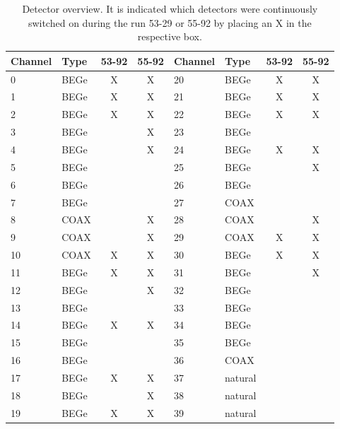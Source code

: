 \begin{table}
    \centering
	\begin{tabular}{|l|l|c|c||l|l|c|c|}
		\hline
		Channel & Type & 53-92 & 55-92 & Channel & Type & 53-92 & 55-92 \\
		\hline
		0 & BEGe & X & X & 20 & BEGe & X & X \\
		\hline
		1 & BEGe & X & X & 21 & BEGe & X & X \\
		\hline
		2 & BEGe & X & X & 22 & BEGe & X & X \\
		\hline
		3 & BEGe &  & X & 23 & BEGe &  &  \\
		\hline
		4 & BEGe &  & X & 24 & BEGe & X & X \\
		\hline
		5 & BEGe &  &  & 25 & BEGe &  & X \\
		\hline
		6 & BEGe &  &  & 26 & BEGe &  &  \\
		\hline
		7 & BEGe &  &  & 27 & COAX &  &  \\
		\hline
		8 & COAX &  & X & 28 & COAX &  & X \\
		\hline
		9 & COAX &  & X & 29 & COAX & X & X \\
		\hline
		10 & COAX & X & X & 30 & BEGe & X & X \\
		\hline
		11 & BEGe & X & X & 31 & BEGe &  & X \\
		\hline
		12 & BEGe &  & X & 32 & BEGe &  &  \\
		\hline
		13 & BEGe &  &  & 33 & BEGe &  &  \\
		\hline
		14 & BEGe & X & X & 34 & BEGe & &  \\
		\hline
		15 & BEGe &  &  & 35 & BEGe &  &  \\
		\hline
		16 & BEGe &  &  & 36 & COAX &  &  \\
		\hline
		17 & BEGe & X & X & 37 & natural &  &  \\
		\hline
		18 & BEGe &  & X & 38 & natural &  &  \\
		\hline
		19 & BEGe & X & X & 39 & natural &  &  \\
		\hline
	\end{tabular}
	\caption{Detector overview. It is indicated which detectors were continuously switched on during the run 53-29 or 55-92 by placing an X in the respective box.}
	\label{tab:Detector}
\end{table}


